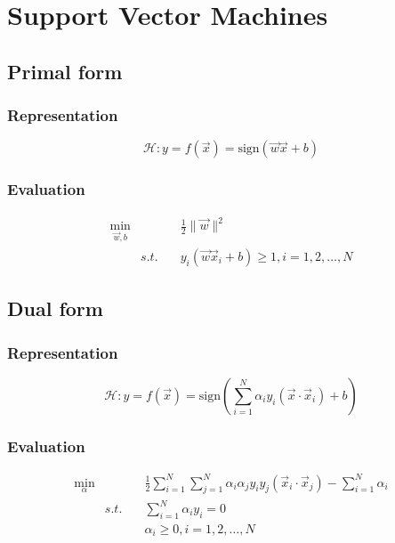 \chapter{Support Vector Machines}
\label{chap:SVM}


\section{Primal form}


\subsection{Representation}

\begin{equation}
\mathcal{H}:y=f(\vec{x})=\text{sign}(\vec{w}\vec{x}+b)
\end{equation}


\subsection{Evaluation}

\begin{eqnarray}
\min_{\vec{w},b}  && \frac{1}{2}\|\vec{w}\|^2 \\
       & s.t. \quad & y_i(\vec{w}\vec{x}_i+b)\geqslant 1, i=1,2, \dots , N
\end{eqnarray}


\section{Dual form}


\subsection{Representation}

\begin{equation}
\mathcal{H}:y=f(\vec{x})=\text{sign}\left(\sum\limits_{i=1}^N{\alpha_iy_i(\vec{x} \cdot \vec{x}_i)}+b\right)
\end{equation}


\subsection{Evaluation}

\begin{eqnarray}
 \min_{\alpha} && \frac{1}{2} \sum\limits_{i=1}^N\sum\limits_{j=1}^N \alpha_i\alpha_j y_i y_j (\vec{x}_i \cdot \vec{x}_j) - \sum\limits_{i=1}^N \alpha_i \\
               & s.t.  \quad &\sum\limits_{i=1}^N\alpha_i y_i=0 \\
               && \alpha_i \geqslant 0, i=1,2, \dots, N
\end{eqnarray}



